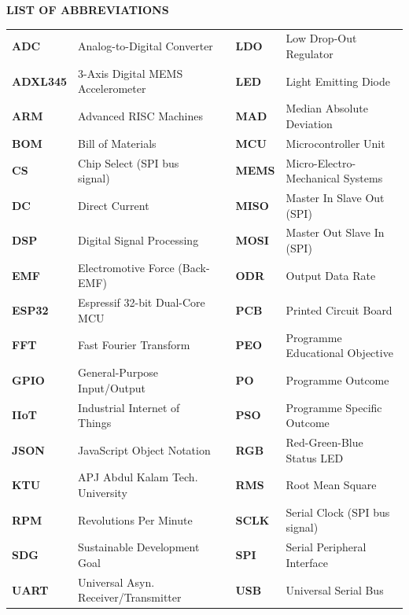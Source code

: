 \begin{center}
\textbf{\fontsize{16}{28}\selectfont LIST OF ABBREVIATIONS}
\end{center}
\vspace{0.8em}

\noindent
\small
\begin{tabular}{ll p{0.3cm} ll}
\textbf{ADC} & Analog-to-Digital Converter & & \textbf{LDO} & Low Drop-Out Regulator \\
\textbf{ADXL345} & 3-Axis Digital MEMS Accelerometer & & \textbf{LED} & Light Emitting Diode \\
\textbf{ARM} & Advanced RISC Machines & & \textbf{MAD} & Median Absolute Deviation \\
\textbf{BOM} & Bill of Materials & & \textbf{MCU} & Microcontroller Unit \\
\textbf{CS} & Chip Select (SPI bus signal) & & \textbf{MEMS} & Micro-Electro-Mechanical Systems \\
\textbf{DC} & Direct Current & & \textbf{MISO} & Master In Slave Out (SPI) \\
\textbf{DSP} & Digital Signal Processing & & \textbf{MOSI} & Master Out Slave In (SPI) \\
\textbf{EMF} & Electromotive Force (Back-EMF) & & \textbf{ODR} & Output Data Rate \\
\textbf{ESP32} & Espressif 32-bit Dual-Core MCU & & \textbf{PCB} & Printed Circuit Board \\
\textbf{FFT} & Fast Fourier Transform & & \textbf{PEO} & Programme Educational Objective \\
\textbf{GPIO} & General-Purpose Input/Output & & \textbf{PO} & Programme Outcome \\
\textbf{IIoT} & Industrial Internet of Things & & \textbf{PSO} & Programme Specific Outcome \\
\textbf{JSON} & JavaScript Object Notation & & \textbf{RGB} & Red-Green-Blue Status LED \\
\textbf{KTU} & APJ Abdul Kalam Tech. University & & \textbf{RMS} & Root Mean Square \\
\textbf{RPM} & Revolutions Per Minute & & \textbf{SCLK} & Serial Clock (SPI bus signal) \\
\textbf{SDG} & Sustainable Development Goal & & \textbf{SPI} & Serial Peripheral Interface \\
\textbf{UART} & Universal Asyn. Receiver/Transmitter & & \textbf{USB} & Universal Serial Bus \\
\end{tabular}
\clearpage
